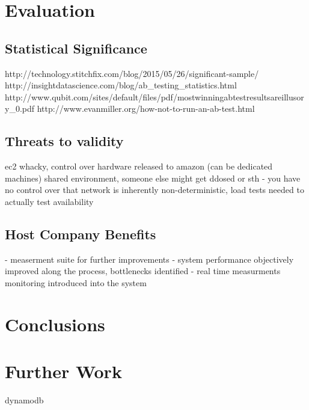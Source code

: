 \documentclass{uvamscse}
\begin{document}
\chapter{Evaluation}\label{Evaluation}

\section{Statistical Significance}
http://technology.stitchfix.com/blog/2015/05/26/significant-sample/
http://insightdatascience.com/blog/ab\_testing\_statistics.html
http://www.qubit.com/sites/default/files/pdf/mostwinningabtestresultsareillusory\_0.pdf
http://www.evanmiller.org/how-not-to-run-an-ab-test.html


\section{Threats to validity}
ec2 whacky, control over hardware released to amazon (can be dedicated machines)
shared environment, someone else might get ddosed or sth - you have no control over that
network is inherently non-deterministic, load tests needed to actually test availability

\section{Host Company Benefits}
- measerment suite for further improvements
- system performance objectively improved along the process, bottlenecks identified
- real time measurments monitoring introduced into the system

\chapter{Conclusions}\label{Conclusions}

\chapter{Further Work}\label{Further Work}
dynamodb

\end{document}
